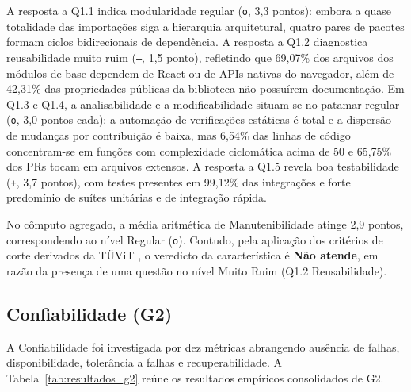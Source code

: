 \documentclass[12pt]{article}
\begin{document}
A resposta a Q1.1 indica modularidade regular (\texttt{o}, 3,3 pontos): embora a quase totalidade das importações siga a hierarquia arquitetural, quatro pares de pacotes formam ciclos bidirecionais de dependência. A resposta a Q1.2 diagnostica reusabilidade muito ruim (\texttt{--}, 1,5 ponto), refletindo que 69,07\% dos arquivos dos módulos de base dependem de React ou de APIs nativas do navegador, além de 42,31\% das propriedades públicas da biblioteca não possuírem documentação. Em Q1.3 e Q1.4, a analisabilidade e a modificabilidade situam-se no patamar regular (\texttt{o}, 3,0 pontos cada): a automação de verificações estáticas é total e a dispersão de mudanças por contribuição é baixa, mas 6,54\% das linhas de código concentram-se em funções com complexidade ciclomática acima de 50 e 65,75\% dos PRs tocam em arquivos extensos. A resposta a Q1.5 revela boa testabilidade (\texttt{+}, 3,7 pontos), com testes presentes em 99,12\% das integrações e forte predomínio de suítes unitárias e de integração rápida.

No cômputo agregado, a média aritmética de Manutenibilidade atinge 2,9 pontos, correspondendo ao nível Regular (\texttt{o}). Contudo, pela aplicação dos critérios de corte derivados da TÜViT \cite{baggen2010}, o veredicto da característica é \textbf{Não atende}, em razão da presença de uma questão no nível Muito Ruim (Q1.2 Reusabilidade).

\subsection{Confiabilidade (G2)}
\label{subsec:resultados-g2}

A Confiabilidade foi investigada por dez métricas abrangendo ausência de falhas, disponibilidade, tolerância a falhas e recuperabilidade. A Tabela~\ref{tab:resultados_g2} reúne os resultados empíricos consolidados de G2.
\end{document}
